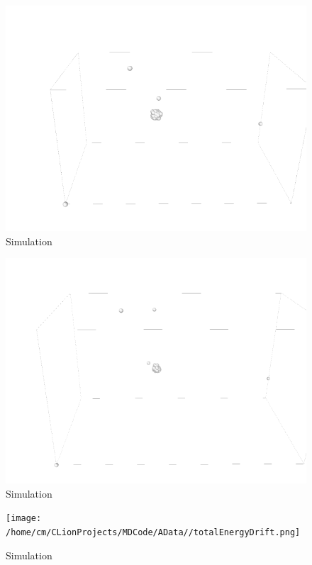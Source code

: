 \begin{figure}[!h]
	\begin{center}
		\includegraphics[scale= 1]{Figure/3Image.png}
	\end{center}
	\caption[Simulation]{Simulation }
	\label{Simulation3}
\end{figure}
\begin{figure}[!h]
	\begin{center}
		\includegraphics[scale= 1]{Figure/4Image.png}
	\end{center}
	\caption[Simulation]{Simulation }
	\label{Simulation4}
\end{figure}
\begin{figure}[!h]
	\begin{center}
		\texttt{[image: /home/cm/CLionProjects/MDCode/AData//totalEnergyDrift.png]}
	\end{center}
	\caption[Simulation]{Simulation }
	\label{Simulation5}
\end{figure}